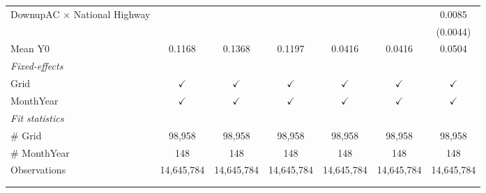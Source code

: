 \begin{table}[htbp]
\begin{tabular}{lcccccc}
      DownupAC $\times$ National Highway                         &               &               &               &               &               & 0.0085\\   
                                                                 &               &               &               &               &               & (0.0044)\\   
      \hline Mean Y0                                             & 0.1168        & 0.1368        & 0.1197        & 0.0416        & 0.0416        & 0.0504\\  
      \midrule
      \emph{Fixed-effects}\\
      Grid                                                       & $\checkmark$  & $\checkmark$  & $\checkmark$  & $\checkmark$  & $\checkmark$  & $\checkmark$\\   
      MonthYear                                                  & $\checkmark$  & $\checkmark$  & $\checkmark$  & $\checkmark$  & $\checkmark$  & $\checkmark$\\   
      \midrule
      \emph{Fit statistics}\\
      \# Grid                                                    & 98,958        & 98,958        & 98,958        & 98,958        & 98,958        & 98,958\\  
      \# MonthYear                                               & 148           & 148           & 148           & 148           & 148           & 148\\  
      Observations                                               & 14,645,784    & 14,645,784    & 14,645,784    & 14,645,784    & 14,645,784    & 14,645,784\\  
      \midrule \midrule
                                                                 &               &               &               &               &               &  \tabularnewline 
      \\
   \end{tabular}
\end{table}


